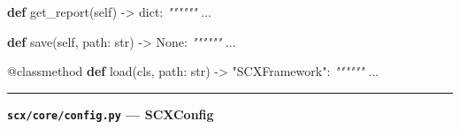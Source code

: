 \documentclass[
  12pt,
]{article}
\newenvironment{Shaded}{}{}
\newcommand{\AttributeTok}[1]{\textcolor[rgb]{0.49,0.56,0.16}{#1}}
\newcommand{\BuiltInTok}[1]{\textcolor[rgb]{0.00,0.50,0.00}{#1}}
\newcommand{\CommentTok}[1]{\textcolor[rgb]{0.38,0.63,0.69}{\textit{#1}}}
\newcommand{\KeywordTok}[1]{\textcolor[rgb]{0.00,0.44,0.13}{\textbf{#1}}}
\newcommand{\NormalTok}[1]{#1}
\newcommand{\OperatorTok}[1]{\textcolor[rgb]{0.40,0.40,0.40}{#1}}
\newcommand{\StringTok}[1]{\textcolor[rgb]{0.25,0.44,0.63}{#1}}
\newcommand{\VariableTok}[1]{\textcolor[rgb]{0.10,0.09,0.49}{#1}}
\begin{document}
\begin{Shaded}
\begin{Highlighting}[]
    \KeywordTok{def}\NormalTok{ get\_report(}\VariableTok{self}\NormalTok{) }\OperatorTok{{-}\textgreater{}} \BuiltInTok{dict}\NormalTok{:}
        \CommentTok{""""""}
\NormalTok{        ...}

    \KeywordTok{def}\NormalTok{ save(}\VariableTok{self}\NormalTok{, path: }\BuiltInTok{str}\NormalTok{) }\OperatorTok{{-}\textgreater{}} \VariableTok{None}\NormalTok{:}
        \CommentTok{""""""}
\NormalTok{        ...}

    \AttributeTok{@classmethod}
    \KeywordTok{def}\NormalTok{ load(cls, path: }\BuiltInTok{str}\NormalTok{) }\OperatorTok{{-}\textgreater{}} \StringTok{"SCXFramework"}\NormalTok{:}
        \CommentTok{""""""}
\NormalTok{        ...}
\end{Highlighting}
\end{Shaded}



\begin{center}\rule{0.5\linewidth}{0.5pt}\end{center}

\textbf{\texttt{scx/core/config.py} --- SCXConfig}
\end{document}
